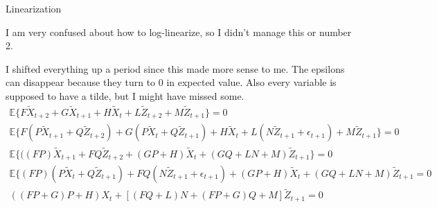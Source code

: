 \documentclass[12pt]{article}
\newenvironment{problem}[2][Problem]{\begin{trivlist}
\item[\hskip \labelsep {\bfseries #1}\hskip \labelsep {\bfseries #2.}]}{\end{trivlist}}
\theoremstyle{definition}
\theoremstyle{definition}
\theoremstyle{definition}
\theoremstyle{definition}
\begin{document}
\begin{section}{Linearization}

\begin{problem}{1}
I am very confused about how to log-linearize, so I didn't manage this or number 2.
\end{problem}

\begin{problem}{3}
I shifted everything up a period since this made more sense to me. The epsilons can disappear because they turn to 0 in expected value. Also every variable is supposed to have a tilde, but I might have missed some.
\begin{align*}
\mathbb{E} \{ F \tilde{X}_{t+2} + G \tilde{X}_{t+1} + H \tilde{X}_{t} + L \tilde{Z}_{t+2} + M \tilde{Z}_{t+1}\} = 0 \\
\mathbb{E} \{ F (P\tilde{X}_{t+1} + Q\tilde{Z}_{t+2}) + G (P\tilde{X}_{t} + Q\tilde{Z}_{t+1}) + H \tilde{X}_{t} + L (N \tilde{Z}_{t+1} + \epsilon_{t+1}) + M\tilde{Z}_{t+1} \} = 0 \\
\mathbb{E} \{((FP)\tilde{X}_{t+1} + FQ\tilde{Z}_{t+2} + (GP+H)\tilde{X}_t + (GQ + LN + M)\tilde{Z}_{t+1} \} = 0 \\
\mathbb{E} \{(FP)(P\tilde{X}_{t} + Q\tilde{Z}_{t+1}) + FQ(N \tilde{Z}_{t+1} + \epsilon_{t+1}) + (GP+H)\tilde{X}_t + (GQ + LN + M)\tilde{Z}_{t+1} = 0 \\ 
((FP+G)P + H)X_t + [(FQ + L)N + (FP + G)Q +M]\tilde{Z}_{t+1} = 0
\end{align*}

\end{problem}

\end{section}
\end{document}
